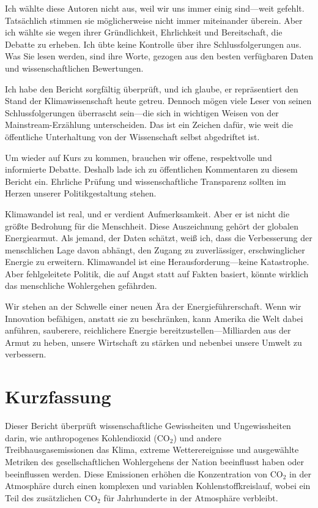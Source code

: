\documentclass[12pt,paper=a4,DIV=12,parskip=never,chapterprefix=false,headings=standardclasses]{scrreprt}
\begin{document}
Ich wählte diese Autoren nicht aus, weil wir uns immer einig sind—weit gefehlt. Tatsächlich stimmen sie möglicherweise nicht immer miteinander überein. Aber ich wählte sie wegen ihrer Gründlichkeit, Ehrlichkeit und Bereitschaft, die Debatte zu erheben. Ich übte keine Kontrolle über ihre Schlussfolgerungen aus. Was Sie lesen werden, sind ihre Worte, gezogen aus den besten verfügbaren Daten und wissenschaftlichen Bewertungen.

Ich habe den Bericht sorgfältig überprüft, und ich glaube, er repräsentiert den Stand der Klimawissenschaft heute getreu. Dennoch mögen viele Leser von seinen Schlussfolgerungen überrascht sein—die sich in wichtigen Weisen von der Mainstream-Erzählung unterscheiden. Das ist ein Zeichen dafür, wie weit die öffentliche Unterhaltung von der Wissenschaft selbst abgedriftet ist.

Um wieder auf Kurs zu kommen, brauchen wir offene, respektvolle und informierte Debatte. Deshalb lade ich zu öffentlichen Kommentaren zu diesem Bericht ein. Ehrliche Prüfung und wissenschaftliche Transparenz sollten im Herzen unserer Politikgestaltung stehen.

Klimawandel ist real, und er verdient Aufmerksamkeit. Aber er ist nicht die größte Bedrohung für die Menschheit. Diese Auszeichnung gehört der globalen Energiearmut. Als jemand, der Daten schätzt, weiß ich, dass die Verbesserung der menschlichen Lage davon abhängt, den Zugang zu zuverlässiger, erschwinglicher Energie zu erweitern. Klimawandel ist eine Herausforderung—keine Katastrophe. Aber fehlgeleitete Politik, die auf Angst statt auf Fakten basiert, könnte wirklich das menschliche Wohlergehen gefährden.

Wir stehen an der Schwelle einer neuen Ära der Energieführerschaft. Wenn wir Innovation befähigen, anstatt sie zu beschränken, kann Amerika die Welt dabei anführen, sauberere, reichlichere Energie bereitzustellen—Milliarden aus der Armut zu heben, unsere Wirtschaft zu stärken und nebenbei unsere Umwelt zu verbessern.

\cleardoublepage
\chapter*{Kurzfassung}
Dieser Bericht überprüft wissenschaftliche Gewissheiten und Ungewissheiten darin, wie anthropogenes Kohlendioxid (CO$_2$) und andere Treibhausgasemissionen das Klima, extreme Wetterereignisse und ausgewählte Metriken des gesellschaftlichen Wohlergehens der Nation beeinflusst haben oder beeinflussen werden. Diese Emissionen erhöhen die Konzentration von CO$_2$ in der Atmosphäre durch einen komplexen und variablen Kohlenstoffkreislauf, wobei ein Teil des zusätzlichen CO$_2$ für Jahrhunderte in der Atmosphäre verbleibt.
\end{document}
